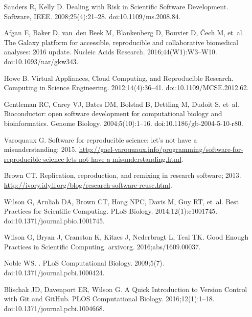 \documentclass[10pt,letterpaper]{article}
\begin{document}
\begin{thebibliography}{10}
Sanders R, Kelly D.
\newblock Dealing with Risk in Scientific Software Development.
\newblock Software, IEEE. 2008;25(4):21--28.
\newblock doi:{10.1109/ms.2008.84}.

Afgan E, Baker D, van~den Beek M, Blankenberg D, Bouvier D, Čech M, et~al.
\newblock The Galaxy platform for accessible, reproducible and collaborative
  biomedical analyses: 2016 update.
\newblock Nucleic Acids Research. 2016;44(W1):W3--W10.
\newblock doi:{10.1093/nar/gkw343}.

Howe B.
\newblock Virtual Appliances, Cloud Computing, and Reproducible Research.
\newblock Computing in Science Engineering. 2012;14(4):36--41.
\newblock doi:{10.1109/MCSE.2012.62}.

Gentleman RC, Carey VJ, Bates DM, Bolstad B, Dettling M, Dudoit S, et~al.
\newblock Bioconductor: open software development for computational biology and
  bioinformatics.
\newblock Genome Biology. 2004;5(10):1--16.
\newblock doi:{10.1186/gb-2004-5-10-r80}.

Varoquaux G. Software for reproducible science: let’s not have a
  misunderstanding; 2015.
\newblock
  \url{http://gael-varoquaux.info/programming/software-for-reproducible-science-lets-not-have-a-misunderstanding.html}.

Brown CT. Replication, reproduction, and remixing in research software; 2013.
\newblock \url{http://ivory.idyll.org/blog/research-software-reuse.html}.

Wilson G, Aruliah DA, Brown CT, Hong NPC, Davis M, Guy RT, et~al.
\newblock Best Practices for Scientific Computing.
\newblock PLoS Biology. 2014;12(1):e1001745.
\newblock doi:{10.1371/journal.pbio.1001745}.

Wilson G, Bryan J, Cranston K, Kitzes J, Nederbragt L, Teal TK.
\newblock Good Enough Practices in Scientific Computing.
\newblock arxivorg. 2016;abs/1609.00037.

Noble WS.
.
\newblock PLoS Computational Biology. 2009;5(7).
\newblock doi:{10.1371/journal.pcbi.1000424}.

Blischak JD, Davenport ER, Wilson G.
\newblock A Quick Introduction to Version Control with Git and GitHub.
\newblock PLOS Computational Biology. 2016;12(1):1--18.
\newblock doi:{10.1371/journal.pcbi.1004668}.


\end{thebibliography}
\end{document}
